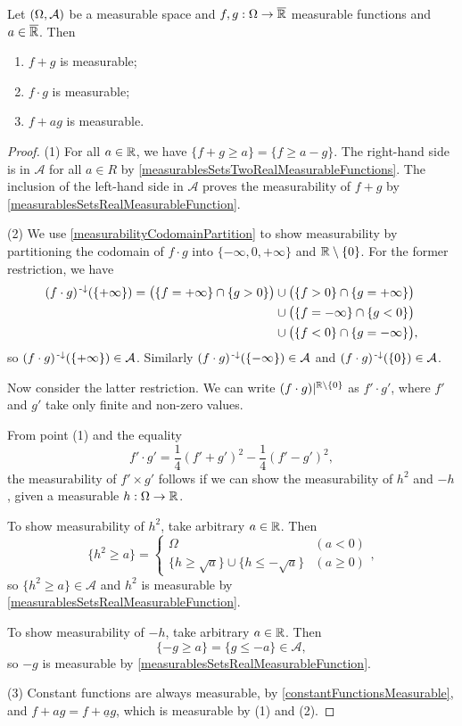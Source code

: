 \begin{proposition} \label{operationsOnRealMeasurableFunctions}
Let $\sSet{\Omega, \mathcal{A}}$ be a measurable space and $f,g: \Omega \to \overline{\mathbb{R}}$ measurable functions and $a\in \overline{\mathbb{R}}$. Then
\begin{enumerate}
\item $f+g$ is measurable;
\item $f\cdot g$ is measurable;
\item $f+ ag$ is measurable.
\end{enumerate}
\end{proposition}
\begin{proof}
(1) For all $a\in\mathbb{R}$, we have $\{f + g \geq a\} = \{f \geq a - g\}$. The right-hand side is in $\mathcal{A}$ for all $a\in R$ by \ref{measurablesSetsTwoRealMeasurableFunctions}. The inclusion of the left-hand side in $\mathcal{A}$ proves the measurability of $f+g$ by \ref{measurablesSetsRealMeasurableFunction}.

(2) We use \ref{measurabilityCodomainPartition} to show measurability by partitioning the codomain of $f\cdot g$ into $\{-\infty, 0, +\infty\}$ and $\mathbb{R}\setminus\{0\}$.
For the former restriction, we have
\begin{align*}
(f\cdot g)^{\text{\hspace{0.15em}-}\downarrow}(\{+\infty\}) = \big(\{f = +\infty\}\cap \{g > 0\}\big) &\cup \big(\{f > 0\} \cap \{g = +\infty\}\big) \\ &\cup \big(\{f = -\infty\}\cap \{g < 0\}\big) \\ &\cup \big(\{f < 0\} \cap \{g = -\infty\}\big),
\end{align*}
so $(f\cdot g)^{\text{\hspace{0.15em}-}\downarrow}(\{+\infty\})\in\mathcal{A}$. Similarly $(f\cdot g)^{\text{\hspace{0.15em}-}\downarrow}(\{-\infty\})\in\mathcal{A}$ and $(f\cdot g)^{\text{\hspace{0.15em}-}\downarrow}(\{0\})\in\mathcal{A}$.

Now consider the latter restriction. We can write $(f\cdot g)|^{\mathbb{R}\setminus\{0\}}$ as $f'\cdot g'$, where $f'$ and $g'$ take only finite and non-zero values.

From point (1) and the equality
\[ f'\cdot g' = \frac{1}{4}(f'+g')^2 - \frac{1}{4}(f'-g')^2, \]
the measurability of $f'\times g'$ follows if we can show the measurability of $h^2$ and $-h$, given a measurable $h:\Omega \to \mathbb{R}$.

To show measurability of $h^2$, take arbitrary $a\in\mathbb{R}$. Then
\[ \{h^2 \geq a\} = \begin{cases}
\Omega & (a < 0) \\
\{h \geq \sqrt{a}\} \cup \{h \leq -\sqrt{a}\} & (a \geq 0)
\end{cases}, \]
so $\{h^2 \geq a\} \in \mathcal{A}$ and $h^2$ is measurable by \ref{measurablesSetsRealMeasurableFunction}.

To show measurability of $-h$, take arbitrary $a\in\mathbb{R}$. Then
\[ \{ -g \geq a \} = \{g \leq -a\} \in \mathcal{A}, \]
so $-g$ is measurable by \ref{measurablesSetsRealMeasurableFunction}.

(3) Constant functions are always measurable, by \ref{constantFunctionsMeasurable}, and $f + ag = f + \underline{a}g$, which is measurable by (1) and (2).
\end{proof}


